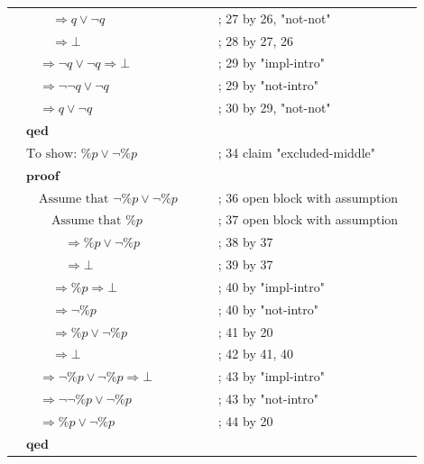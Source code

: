 \documentclass{article}
\begin{document}
\begin{flushleft}
\begin{tabular}{L{0.45\linewidth} L{0.45\linewidth}}
$ \quad\quad\quad \Rightarrow q \lor \lnot q  $ & ; 27 by 26, "not-not" \\
$ \quad\quad\quad \Rightarrow \bot $ & ; 28 by 27, 26 \\
$ \quad\quad \Rightarrow \lnot q \lor \lnot q \Rightarrow \bot $ & ; 29 by "impl-intro" \\
$ \quad\quad \Rightarrow \lnot \lnot q \lor \lnot q  $ & ; 29 by "not-intro" \\
$ \quad\quad \Rightarrow q \lor \lnot q  $ & ; 30 by 29, "not-not" \\
$ \quad \textbf{qed} $ \\
$ \quad \text{To show: } \%p \lor \lnot \%p  $ & ; 34 claim "excluded-middle" \\
$ \quad \textbf{proof} $ \\
$ \quad\quad \text{Assume that } \lnot \%p \lor \lnot \%p  $ & ; 36 open block with assumption \\
$ \quad\quad\quad \text{Assume that } \%p $ & ; 37 open block with assumption \\
$ \quad\quad\quad\quad \Rightarrow \%p \lor \lnot \%p  $ & ; 38 by 37 \\
$ \quad\quad\quad\quad \Rightarrow \bot $ & ; 39 by 37 \\
$ \quad\quad\quad \Rightarrow \%p \Rightarrow \bot $ & ; 40 by "impl-intro" \\
$ \quad\quad\quad \Rightarrow \lnot \%p $ & ; 40 by "not-intro" \\
$ \quad\quad\quad \Rightarrow \%p \lor \lnot \%p  $ & ; 41 by 20 \\
$ \quad\quad\quad \Rightarrow \bot $ & ; 42 by 41, 40 \\
$ \quad\quad \Rightarrow \lnot \%p \lor \lnot \%p \Rightarrow \bot $ & ; 43 by "impl-intro" \\
$ \quad\quad \Rightarrow \lnot \lnot \%p \lor \lnot \%p  $ & ; 43 by "not-intro" \\
$ \quad\quad \Rightarrow \%p \lor \lnot \%p  $ & ; 44 by 20 \\
$ \quad \textbf{qed} $ \\
% 
\end{tabular}
\end{flushleft}
\end{document}
